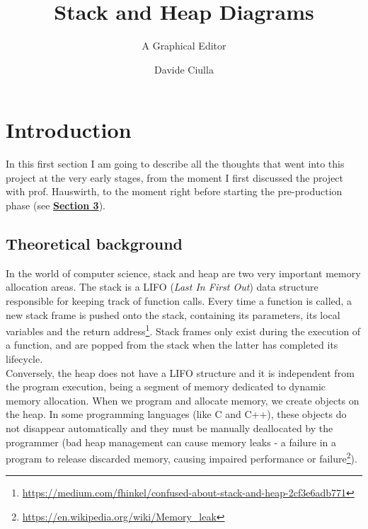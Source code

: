 \documentclass[]{usiinfbachelorproject}
\author{Davide Ciulla}
\title{Stack and Heap Diagrams}
\subtitle{A Graphical Editor}
\begin{document}
\maketitle


\tableofcontents
\newpage


\section{Introduction} \label{introduction}

In this first section I am going to describe all the thoughts that went into this project at the very early stages, from the moment I first discussed the project with prof. Hauswirth, to the moment right before starting the pre-production phase (see \hyperref[requirements+analysis]{\textbf{Section 3}}).

\subsection{Theoretical background}

\noindent In the world of computer science, stack and heap are two very important memory allocation areas. The stack is a LIFO (\emph{Last In First Out}) data structure responsible for keeping track of function calls. Every time a function is called, a new stack frame is pushed onto the stack, containing its parameters, its local variables
 and the return address\footnote{\url{https://medium.com/fhinkel/confused-about-stack-and-heap-2cf3e6adb771}}. Stack frames only exist during the execution of a function, and are popped from the stack when the latter has completed its lifecycle.\\
 Conversely, the heap does not have a LIFO structure and it is independent from the program execution, being a segment of memory dedicated to dynamic memory allocation. When we program and allocate memory, we create objects on the heap. In some programming languages (like C and C++), these objects do not disappear automatically and they must be manually deallocated by the programmer (bad heap management can cause memory leaks - a failure in a program to release discarded memory, causing impaired performance or failure\footnote {\url{https://en.wikipedia.org/wiki/Memory_leak}}).\\
 
\end{document}
